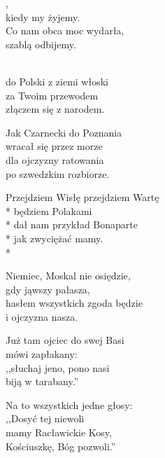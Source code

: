 \documentclass[12pt,a4paper,twoside]{songbook}
\begin{document}
  \begin{info}
    \lipsum
  \end{info}

  
  \begin{lyrics}[multicol=true, longestline=Przejdziem Wisłę przejdziem Wartę]
    ,\\
    kiedy my żyjemy.\\
    Co nam obca moc wydarła,\\
    szablą odbijemy.
    
    \begin{chorus}
    \\
    do Polski z ziemi włoski\\
    za Twoim przewodem\\
    złączem się z narodem.
    \end{chorus}%
    
    Jak Czarnecki do Poznania\\
    wracał się przez morze\\
    dla ojczyzny ratowania\\
    po szwedzkim rozbiorze.
    
    \chorusref
    
    Przejdziem Wisłę przejdziem Wartę\\*
    będziem Polakami\\*
    dał nam przykład Bonaparte\\*
    jak zwyciężać mamy.\\*
    
    \chorusref
    
    Niemiec, Moskal nie osiędzie,\\
    gdy jąwszy pałasza,\\
    hasłem wszystkich zgoda będzie\\
    i ojczyzna nasza.

    \chorusref

    Już tam ojciec do swej Basi\\
    mówi zapłakany:\\
    ,,słuchaj jeno, pono nasi\\
    biją w tarabany.''

    \chorusref

    Na to wszystkich jedne głosy:\\
    ,,Dosyć tej niewoli\\
    mamy Racławickie Kosy,\\
    Kościuszkę, Bóg pozwoli.''
  \end{lyrics}
  
\end{document}

